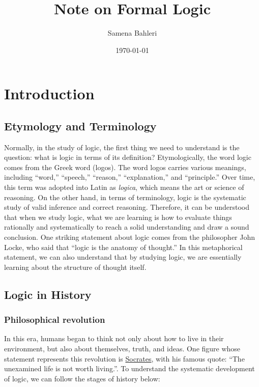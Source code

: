 \documentclass[12pt,a4paper]{book}
\title{Note on Formal Logic}
\author{Samena Bahleri}
\date{\today}
\begin{document}
\frontmatter
\maketitle
\tableofcontents

\mainmatter

\chapter{Introduction}

\section{Etymology and Terminology}\label{etymology-and-terminology}
Normally, in the study of logic, the first thing we need to understand
is the question: what is logic in terms of its definition?
Etymologically, the word logic comes from the Greek word (logos).
The word logos carries various meanings, including ``word,'' ``speech,''
``reason,'' ``explanation,'' and ``principle.'' Over time, this term was
adopted into Latin as \emph{logica}, which means the art or science of
reasoning. On the other hand, in terms of terminology, logic is the
systematic study of valid inference and correct reasoning. Therefore, it
can be understood that when we study logic, what we are learning is how
to evaluate things rationally and systematically to reach a solid
understanding and draw a sound conclusion. One striking statement about
logic comes from the philosopher John Locke, who said that ``logic is
the anatomy of thought.'' In this metaphorical statement, we can also
understand that by studying logic, we are essentially learning about the
structure of thought itself.

\section{Logic in History}\label{logic-in-history}

\subsection{Philosophical revolution}\label{philosophical-revolution}
In this era, humans began to think not only about how to live in their
environment, but also about themselves, truth, and ideas. One figure
whose statement represents this revolution is
\href{https://en.wikipedia.org/wiki/Socrates}{Socrates}, with his famous
quote: ``The unexamined life is not worth living.''. To understand the
systematic development of logic, we can follow the stages of history
below:
\end{document}
